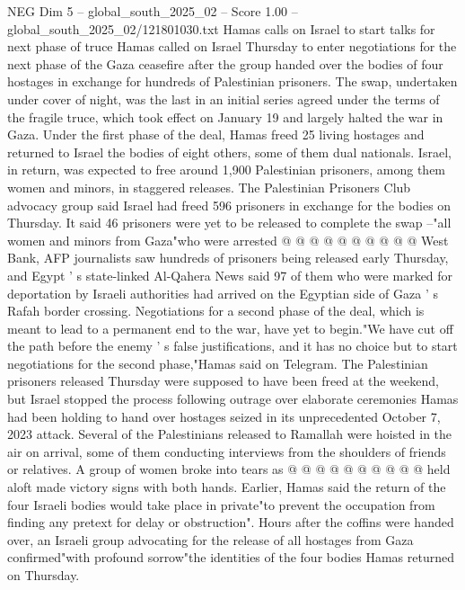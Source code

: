 \begin{textsample}{NEG Dim 5 – global\_south\_2025\_02 – Score 1.00 – global\_south\_2025\_02/121801030.txt}  \label{ex:f5_neg_246}
Hamas calls on Israel to start talks for next phase of truce Hamas called on Israel Thursday to enter negotiations for the next phase of the Gaza ceasefire after the group handed over the bodies of four hostages in exchange for hundreds of Palestinian prisoners.
The swap, undertaken under cover of night, was the last in an initial series agreed under the terms of the fragile truce, which took effect on January 19 and largely halted the war in Gaza.
Under the first phase of the deal, Hamas freed 25 living hostages and returned to Israel the bodies of eight others, some of them dual nationals.
Israel, in return, was expected to free around 1,900 Palestinian prisoners, among them women and minors, in staggered releases.
The Palestinian Prisoners Club advocacy group said Israel had freed 596 prisoners in exchange for the bodies on Thursday.
It said 46 prisoners were yet to be released to complete the swap --"all women and minors from Gaza"who were arrested @ @ @ @ @ @ @ @ @ @ West Bank, AFP journalists saw hundreds of prisoners being released early Thursday, and Egypt ' s state-linked Al-Qahera News said 97 of them who were marked for deportation by Israeli authorities had arrived on the Egyptian side of Gaza ' s Rafah border crossing.
Negotiations for a second phase of the deal, which is meant to lead to a permanent end to the war, have yet to begin."We have cut off the path before the enemy ' s false justifications, and it has no choice but to start negotiations for the second phase,"Hamas said on Telegram.
The Palestinian prisoners released Thursday were supposed to have been freed at the weekend, but Israel stopped the process following outrage over elaborate ceremonies Hamas had been holding to hand over hostages seized in its unprecedented October 7, 2023 attack.
Several of the Palestinians released to Ramallah were hoisted in the air on arrival, some of them conducting interviews from the shoulders of friends or relatives.
A group of women broke into tears as @ @ @ @ @ @ @ @ @ @ held aloft made victory signs with both hands.
Earlier, Hamas said the return of the four Israeli bodies would take place in private"to prevent the occupation from finding any pretext for delay or obstruction".
Hours after the coffins were handed over, an Israeli group advocating for the release of all hostages from Gaza confirmed"with profound sorrow"the identities of the four bodies Hamas returned on Thursday.

\end{textsample}
